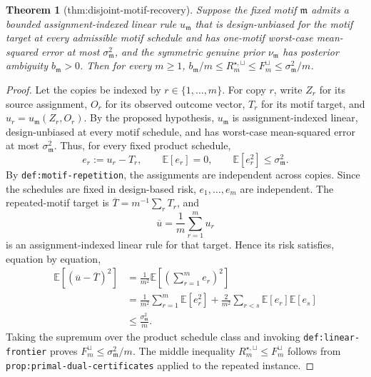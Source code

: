 \documentclass{article}
\newtheorem{theorem}{Theorem}
\begin{document}
\begin{theorem}[thm:disjoint-motif-recovery]\label{thm:disjoint-motif-recovery}
Suppose the fixed motif \(\mathfrak m\) admits a bounded assignment-indexed linear rule \(u_{\mathfrak m}\) that is design-unbiased for the motif target at every admissible motif schedule and has one-motif worst-case mean-squared error at most \(\sigma_{\mathfrak m}^2\), and the symmetric genuine prior \(\nu_{\mathfrak m}\) has posterior ambiguity \(b_{\mathfrak m}>0\). Then for every \(m\ge1\), \(b_{\mathfrak m}/m\le R_m^{\star,\sqcup}\le F_m^{\sqcup}\le\sigma_{\mathfrak m}^2/m\).
\end{theorem}
\begin{proof}
Let the copies be indexed by \(r\in\{1,\ldots,m\}\).  For copy \(r\), write \(Z_r\) for its source assignment, \(O_r\) for its observed outcome vector, \(T_r\) for its motif target, and \(u_r=u_{\mathfrak m}(Z_r,O_r)\).  By the proposed hypothesis, \(u_{\mathfrak m}\) is assignment-indexed linear, design-unbiased at every motif schedule, and has worst-case mean-squared error at most \(\sigma_{\mathfrak m}^2\).  Thus, for every fixed product schedule,
\[
 e_r:=u_r-T_r,
 \qquad
 \mathbb E[e_r]=0,
 \qquad
 \mathbb E[e_r^2]\le\sigma_{\mathfrak m}^2.
\]
By \texttt{def:motif-repetition}, the assignments are independent across copies.  Since the schedules are fixed in design-based risk, \(e_1,\ldots,e_m\) are independent.  The repeated-motif target is \(\overline T=m^{-1}\sum_rT_r\), and
\[
 \overline u=\frac1m\sum_{r=1}^mu_r
\]
is an assignment-indexed linear rule for that target.  Hence its risk satisfies, equation by equation,
\[
\begin{aligned}
 \mathbb E[(\overline u-\overline T)^2]
 &=\frac1{m^2}\mathbb E\left[\left(\sum_{r=1}^me_r\right)^2\right]\\
 &=\frac1{m^2}\sum_{r=1}^m\mathbb E[e_r^2]
   +\frac2{m^2}\sum_{r<s}\mathbb E[e_r]\mathbb E[e_s]\\
 &\le\frac{\sigma_{\mathfrak m}^2}{m}.
\end{aligned}
\]
Taking the supremum over the product schedule class and invoking \texttt{def:linear-frontier} proves \(F_m^{\sqcup}\le\sigma_{\mathfrak m}^2/m\).  The middle inequality \(R_m^{\star,\sqcup}\le F_m^{\sqcup}\) follows from \texttt{prop:primal-dual-certificates} applied to the repeated instance.


\end{proof}
\end{document}
